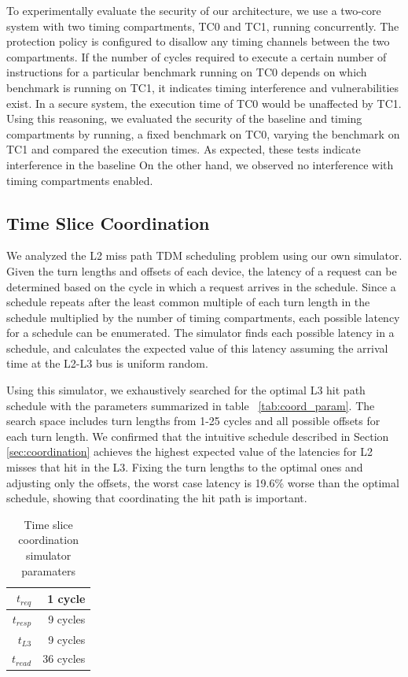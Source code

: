 To experimentally evaluate the security of our architecture, we use a two-core 
system with two timing compartments, TC0 and
TC1, running concurrently. The protection policy is configured to disallow any 
timing channels between the two compartments. If the number of cycles required 
to execute a certain number of instructions for a particular benchmark running
on TC0 depends on which benchmark is running on TC1, it indicates timing 
interference and vulnerabilities exist. In a secure system, the execution time
of TC0 would be unaffected by TC1. Using this reasoning, we evaluated the
security of the baseline and timing  compartments by running, a fixed benchmark
on TC0, varying the benchmark on TC1 and compared the execution times. As
expected, these tests indicate interference in the baseline On the other hand,
we observed no interference with timing compartments enabled.

\subsection{Time Slice Coordination}
\label{sec:eval_coord}
We analyzed the L2 miss path TDM scheduling problem using our own simulator.
Given the turn lengths and offsets of each device, the latency of a request can 
be determined based on the cycle in which a request arrives in the schedule.
Since a schedule repeats after the least common multiple of each turn length in 
the schedule multiplied by the number of timing compartments, each possible 
latency for a schedule can be enumerated. The simulator finds
each possible latency in a schedule, and calculates the expected value of this 
latency assuming the arrival time at the L2-L3 bus is uniform random.

Using this simulator, we exhaustively searched for the optimal L3 hit path 
schedule with the parameters summarized in table ~\ref{tab:coord_param}. The 
search space includes turn lengths from 1-25 cycles and all possible offsets 
for each turn length. We confirmed that the intuitive schedule described in 
Section \ref{sec:coordination} achieves the highest expected value of the 
latencies for L2 misses that hit in the L3.
Fixing the turn lengths to the optimal ones and adjusting only the offsets,
the worst case latency is 19.6\% worse than the optimal schedule, showing
that coordinating the hit path is important.

\begin{table}
    \caption{Time slice coordination simulator paramaters}
    \centering
    \begin{tabular}{|r|r|}
        \hline
        $t_{req}$  &   1 cycle \\\hline
        $t_{resp}$ & 9 cycles \\\hline
        $t_{L3}$   &   9 cycles \\\hline
        $t_{read}$ & 36 cycles \\\hline
    \end{tabular}
    \label{tab:l2_miss_schedules}
\end{table}


